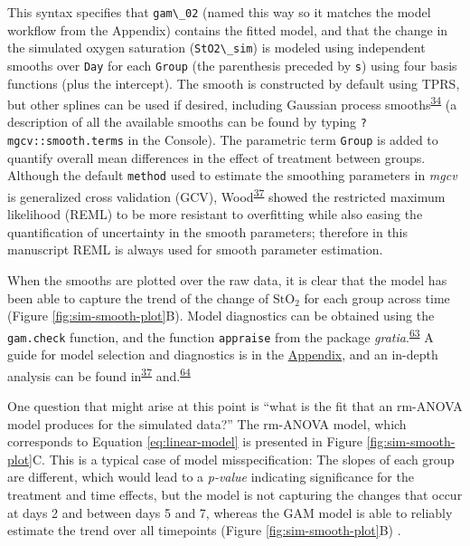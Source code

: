 \documentclass[
]{article}
\newcommand{\passthrough}[1]{#1}
\begin{document}
This syntax specifies that \passthrough{\lstinline!gam\_02!} (named this way so it matches the model workflow from the Appendix) contains the fitted model, and that the change in the simulated oxygen saturation (\passthrough{\lstinline!StO2\_sim!}) is modeled using independent smooths over \passthrough{\lstinline!Day!} for each \passthrough{\lstinline!Group!} (the parenthesis preceded by \passthrough{\lstinline!s!}) using four basis functions (plus the intercept). The smooth is constructed by default using TPRS, but other splines can be used if desired, including Gaussian process smooths\textsuperscript{\protect\hyperlink{ref-simpson2018}{34}} (a description of all the available smooths can be found by typing \passthrough{\lstinline!?mgcv::smooth.terms!} in the Console). The parametric term \passthrough{\lstinline!Group!} is added to quantify overall mean differences in the effect of treatment between groups. Although the default \passthrough{\lstinline!method!} used to estimate the smoothing parameters in \emph{mgcv} is generalized cross validation (GCV), Wood\textsuperscript{\protect\hyperlink{ref-wood2017}{37}} showed the restricted maximum likelihood (REML) to be more resistant to overfitting while also easing the quantification of uncertainty in the smooth parameters; therefore in this manuscript REML is always used for smooth parameter estimation.

When the smooths are plotted over the raw data, it is clear that the model has been able to capture the trend of the change of \(\mbox{StO}_2\) for each group across time (Figure \ref{fig:sim-smooth-plot}B). Model diagnostics can be obtained using the \passthrough{\lstinline!gam.check!} function, and the function \passthrough{\lstinline!appraise!} from the package \emph{gratia}.\textsuperscript{\protect\hyperlink{ref-gratia}{63}} A guide for model selection and diagnostics is in the \protect\hyperlink{workflow}{Appendix}, and an in-depth analysis can be found in\textsuperscript{\protect\hyperlink{ref-wood2017}{37}} and.\textsuperscript{\protect\hyperlink{ref-harezlak2018}{64}}

One question that might arise at this point is ``what is the fit that an rm-ANOVA model produces for the simulated data?'' The rm-ANOVA model, which corresponds to Equation \eqref{eq:linear-model} is presented in Figure \ref{fig:sim-smooth-plot}C. This is a typical case of model misspecification: The slopes of each group are different, which would lead to a \emph{p-value} indicating significance for the treatment and time effects, but the model is not capturing the changes that occur at days 2 and between days 5 and 7, whereas the GAM model is able to reliably estimate the trend over all timepoints (Figure \ref{fig:sim-smooth-plot}B) .
\end{document}
